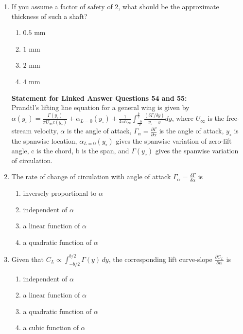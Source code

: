 \documentclass{article}
\begin{document}
\begin{enumerate}
 \item If you assume a factor of safety of 2, what should be the approximate thickness of such a shaft?
 \begin{multicols}{4}
    \begin{enumerate}    
    \item $0.5$ mm
    \item $1$ mm 
    \item $2$ mm 
    \item $4$ mm
    \end{enumerate}
 \end{multicols}

 \textbf{Statement for Linked Answer Questions 54 and 55:}\\

  
Prandtl’s lifting line equation for a general wing is given by 
$\alpha(y_\circ) = \frac{\Gamma(y_\circ)}{\pi U_{\infty} c(y_\circ)} + \alpha_{L=0}(y_\circ) + \frac{1}{4\pi U_\infty} \int_{\frac{-b}{2}}^{\frac{b}{2}}\frac{(\delta \Gamma/\delta y)}{y_\circ - y} dy$, where $U_\infty$ is the free-stream velocity, $\alpha$ is the 
angle of attack,  $\Gamma_\alpha=\frac{\partial \Gamma}{\partial \alpha}$ is the angle of attack, $y_\circ$ is the spanwise location, $\alpha_{L=0}(y_\circ)$ gives the spanwise variation of zero-lift angle, c is the chord, b is the span, and $\Gamma (y_\circ)$ gives the spanwise variation of circulation.

\item The rate of change of circulation with angle of attack $\Gamma_\alpha = \frac{\delta \Gamma}{\delta \alpha}$ is
\begin{multicols}{2}
\begin{enumerate}
\item inversely proportional to $\alpha$
\item independent of $\alpha$
\item a linear function of $\alpha$
\item a quadratic function of $\alpha$
\end{enumerate}
\end{multicols}

\item Given that $C_L \propto \int_{-b/2}^{b/2}\Gamma(y)\,dy$, the corresponding lift curve-slope $\frac{\partial C_L}{\partial \alpha}$ is
\begin{multicols}{2}
\begin{enumerate}
\item independent of $\alpha$
\item a linear function of $\alpha$
\item a quadratic function of $\alpha$
\item a cubic function of $\alpha$
\end{enumerate}
\end{multicols}



\end{enumerate}
\end{document}
